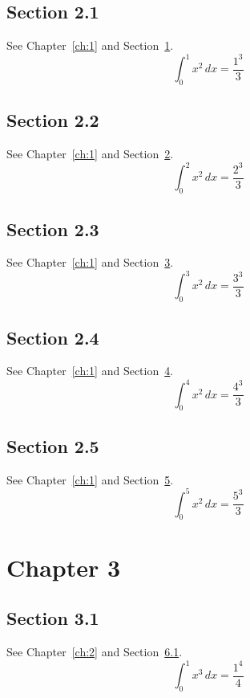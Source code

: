 \documentclass{book}
\begin{document}
\section{Section 2.1}\label{sec:2-1}
See Chapter~\ref{ch:1} and Section~\ref{sec:2-1}.
\lipsum[12-14]
\begin{equation}\label{eq:2-1} \int_0^{1} x^{2}\,dx = \frac{1^{3}}{3}\end{equation}
\section{Section 2.2}\label{sec:2-2}
See Chapter~\ref{ch:1} and Section~\ref{sec:2-2}.
\lipsum[13-15]
\begin{equation}\label{eq:2-2} \int_0^{2} x^{2}\,dx = \frac{2^{3}}{3}\end{equation}
\section{Section 2.3}\label{sec:2-3}
See Chapter~\ref{ch:1} and Section~\ref{sec:2-3}.
\lipsum[14-16]
\begin{equation}\label{eq:2-3} \int_0^{3} x^{2}\,dx = \frac{3^{3}}{3}\end{equation}
\section{Section 2.4}\label{sec:2-4}
See Chapter~\ref{ch:1} and Section~\ref{sec:2-4}.
\lipsum[15-17]
\begin{equation}\label{eq:2-4} \int_0^{4} x^{2}\,dx = \frac{4^{3}}{3}\end{equation}
\section{Section 2.5}\label{sec:2-5}
See Chapter~\ref{ch:1} and Section~\ref{sec:2-5}.
\lipsum[16-18]
\begin{equation}\label{eq:2-5} \int_0^{5} x^{2}\,dx = \frac{5^{3}}{3}\end{equation}
\chapter{Chapter 3}\label{ch:3}
\section{Section 3.1}\label{sec:3-1}
See Chapter~\ref{ch:2} and Section~\ref{sec:3-1}.
\lipsum[17-19]
\begin{equation}\label{eq:3-1} \int_0^{1} x^{3}\,dx = \frac{1^{4}}{4}\end{equation}
\end{document}
